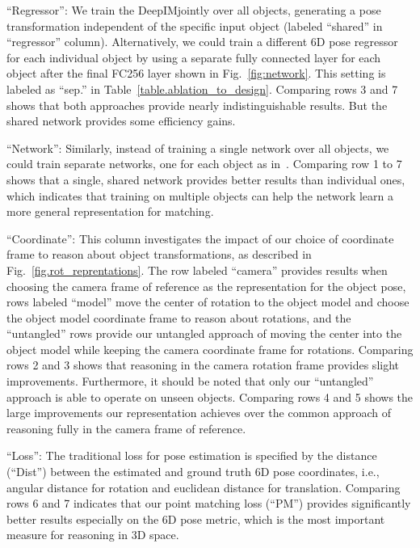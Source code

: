 \documentclass[twocolumn]{svjour3}
\newcommand{\dimnet}[0]{DeepIM}
\begin{document}
``Regressor'': We train the \dimnet\network jointly over all objects, generating a pose transformation independent of the specific input object (labeled ``shared'' in ``regressor'' column). Alternatively, we could train a different 6D pose regressor for each individual object by using a separate fully connected layer for each object after the final FC256 layer shown in Fig.~\ref{fig:network}.  This setting is labeled as ``sep.'' in Table~\ref{table.ablation_to_design}. Comparing rows 3 and 7 shows that both approaches provide nearly indistinguishable results. But the shared network provides some efficiency gains.

``Network'': Similarly, instead of training a single network over all objects, we could train separate networks, one for each object as in~\citep{rad2017bb8}. Comparing row 1 to 7 shows that a single, shared network provides better results than individual ones, which indicates that training on multiple objects can help the network learn a more general representation for matching.

``Coordinate'': This column investigates the impact of our choice of coordinate frame to reason about object transformations, as described in Fig.~\ref{fig.rot_reprentations}. 
The row labeled ``camera'' provides results when choosing the camera frame of reference as the representation for the object pose, 
rows labeled ``model'' move the center of rotation to the object model and choose the object model coordinate frame to reason about rotations, 
and the ``untangled'' rows provide our untangled approach of moving the center into the object model while keeping the camera coordinate frame for rotations. Comparing rows 2 and 3 shows that reasoning in the camera rotation frame provides slight improvements. 
Furthermore, it should be noted that only our ``untangled'' approach is able to operate on unseen objects.  
Comparing rows 4 and 5 shows the large improvements our representation achieves over the common approach of reasoning fully in the camera frame of reference. 

``Loss'': The traditional loss for pose estimation is specified by the distance (``Dist'') between the estimated and ground truth 6D pose coordinates, i.e., angular distance for rotation and euclidean distance for translation. Comparing rows 6 and 7 indicates that our point matching loss (``PM'') provides significantly better results especially on the 6D pose metric, which is the most important measure for reasoning in 3D space. 
\end{document}
